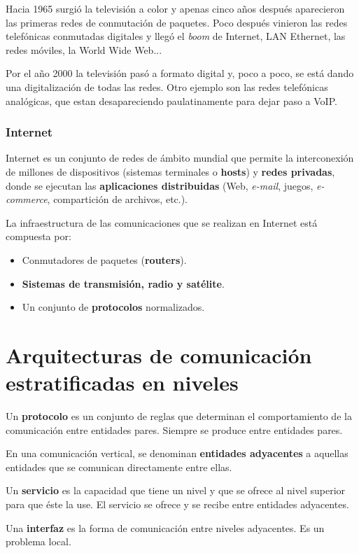 \documentclass[a4paper]{book}
\numberwithin{figure}{chapter}
\numberwithin{equation}{subsection}
\begin{document}
Hacia 1965 surgió la televisión a color y apenas cinco años después aparecieron las primeras redes de conmutación de paquetes. Poco después vinieron las redes telefónicas conmutadas digitales y llegó el \textsl{boom} de Internet, LAN Ethernet, las redes móviles, la World Wide Web...

Por el año 2000 la televisión pasó a formato digital y, poco a poco, se está dando una digitalización de todas las redes. Otro ejemplo son las redes telefónicas analógicas, que estan desapareciendo paulatinamente para dejar paso a VoIP.

\subsection{Internet}
Internet es un conjunto de redes de ámbito mundial que permite la interconexión de millones de dispositivos (sistemas terminales o \textbf{hosts}) y \textbf{redes privadas}, donde se ejecutan las \textbf{aplicaciones distribuidas} (Web, \textsl{e-mail}, juegos, \textsl{e-commerce}, compartición de archivos, etc.).

La infraestructura de las comunicaciones que se realizan en Internet está compuesta por:
\begin{itemize}
  \item Conmutadores de paquetes (\textbf{routers}).
  \item \textbf{Sistemas de transmisión, radio y satélite}.
  \item Un conjunto de \textbf{protocolos} normalizados.
\end{itemize}

\chapter{Arquitecturas de comunicación estratificadas en niveles}


Un \textbf{protocolo} es un conjunto de reglas que determinan el comportamiento de la comunicación entre entidades pares. Siempre se produce entre entidades pares.

En una comunicación vertical, se denominan \textbf{entidades adyacentes} a aquellas entidades que se comunican directamente entre ellas.

Un \textbf{servicio} es la capacidad que tiene un nivel y que se ofrece al nivel superior para que éste la use. El servicio se ofrece y se recibe entre entidades adyacentes.

Una \textbf{interfaz} es la forma de comunicación entre niveles adyacentes. Es un problema local.
\end{document}
